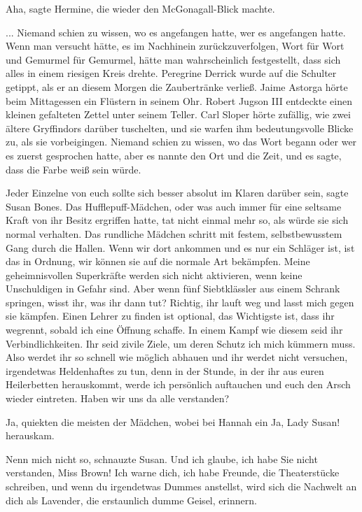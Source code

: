 \glqq{}Aha\grqq{}, sagte Hermine, die wieder den McGonagall-Blick machte.

... Niemand schien zu wissen, wo es angefangen hatte, wer es angefangen hatte.
Wenn man versucht hätte, es im Nachhinein zurückzuverfolgen, Wort für Wort und
Gemurmel für Gemurmel, hätte man wahrscheinlich festgestellt, dass sich alles in
einem riesigen Kreis drehte. Peregrine Derrick wurde auf die Schulter getippt,
als er an diesem Morgen die Zaubertränke verließ. Jaime Astorga hörte beim
Mittagessen ein Flüstern in seinem Ohr. Robert Jugson III entdeckte einen
kleinen gefalteten Zettel unter seinem Teller. Carl Sloper hörte zufällig, wie
zwei ältere Gryffindors darüber tuschelten, und sie warfen ihm bedeutungsvolle
Blicke zu, als sie vorbeigingen. Niemand schien zu wissen, wo das Wort begann
oder wer es zuerst gesprochen hatte, aber es nannte den Ort und die Zeit, und es
sagte, dass die Farbe weiß sein würde.

\glqq{}Jeder Einzelne von euch sollte sich besser absolut im Klaren darüber
sein\grqq{}, sagte Susan Bones. Das Hufflepuff-Mädchen, oder was auch immer für
eine seltsame Kraft von ihr Besitz ergriffen hatte, tat nicht einmal mehr so,
als würde sie sich normal verhalten. Das rundliche Mädchen schritt mit festem,
selbstbewusstem Gang durch die Hallen. \glqq{}Wenn wir dort ankommen und es nur
ein Schläger ist, ist das in Ordnung, wir können sie auf die normale Art
bekämpfen. Meine geheimnisvollen Superkräfte werden sich nicht aktivieren, wenn
keine Unschuldigen in Gefahr sind. Aber wenn fünf Siebtklässler aus einem
Schrank springen, wisst ihr, was ihr dann tut? Richtig, ihr lauft weg und lasst
mich gegen sie kämpfen. Einen Lehrer zu finden ist optional, das Wichtigste ist,
dass ihr wegrennt, sobald ich eine Öffnung schaffe. In einem Kampf wie diesem
seid ihr Verbindlichkeiten. Ihr seid zivile Ziele, um deren Schutz ich mich
kümmern muss. Also werdet ihr so schnell wie möglich abhauen und ihr werdet
nicht versuchen, irgendetwas Heldenhaftes zu tun, denn in der Stunde, in der ihr
aus euren Heilerbetten herauskommt, werde ich persönlich auftauchen und euch den
Arsch wieder eintreten. Haben wir uns da alle verstanden?\grqq{}

\glqq{}Ja\grqq{}, quiekten die meisten der Mädchen, wobei bei Hannah ein \glqq{}
Ja, Lady Susan!\grqq{} herauskam.\grqq{}

\glqq{}Nenn mich nicht so\grqq{}, schnauzte Susan. \glqq{}Und ich glaube, ich habe
Sie nicht verstanden, Miss Brown! Ich warne dich, ich habe Freunde, die
Theaterstücke schreiben, und wenn du irgendetwas Dummes anstellst, wird sich die
Nachwelt an dich als Lavender, die erstaunlich dumme Geisel, erinnern.\grqq{}

